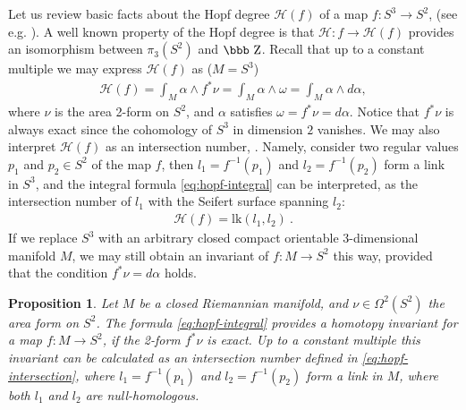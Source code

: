 \documentclass[12pt]{article}
\numberwithin{equation}{section}
\newtheorem{proposition}[theorem]{Proposition}
\newcommand{\Z}{\mbox{\bbb Z}}
\begin{document}
Let us review basic facts about the Hopf degree $\mathscr{H}(f)$ of a map 
$f:S^3\longrightarrow S^2$, (see
e.g. \cite{Bott82}). A well known property of the Hopf degree is that  $\mathscr{H}: f\longrightarrow \mathscr{H}(f)$ provides an isomorphism between $\pi_3(S^2)$
and $\Z$. Recall that up to a constant multiple we
may express $\mathscr{H}(f)$ as ($M=S^3$)
\begin{gather}\label{eq:hopf-integral}
\mathscr{H}(f)= \int_{M} \alpha\wedge f^\ast\nu=\int_{M} \alpha\wedge \omega=\int_{M} \alpha\wedge d\alpha,
\end{gather}
where $\nu$ is the area 2-form on $S^2$, and $\alpha$ satisfies
$\omega=f^\ast\nu=d\alpha$. Notice that $f^\ast\nu$ is always exact
since the cohomology of $S^3$ in dimension $2$ vanishes. We may also interpret $\mathscr{H}(f)$ as an intersection number,
\cite{Bott82, Milnor97}. Namely, consider two regular values $p_1$ and $p_2\in S^2$ of the map $f$,
then $l_1=f^{-1}(p_1)$ and $l_2=f^{-1}(p_2)$ form a link in $S^3$, and the integral formula
\eqref{eq:hopf-integral} can be interpreted, as the intersection number of $l_1$ with the Seifert surface spanning $l_2$:
\begin{gather}\label{eq:hopf-intersection}
\mathscr{H}(f)=\text{lk}(l_1,l_2)\ .
\end{gather}
If we replace $S^3$ with an arbitrary closed
compact orientable 3-dimensional manifold $M$, we may still obtain
an invariant of $f:M\longrightarrow S^2$ this way, provided that
the condition $f^\ast\nu=d\alpha$ holds. 

\begin{proposition}\label{th:hopf-degree-general}
 Let $M$ be a closed Riemannian manifold, and $\nu\in \Omega^2(S^2)$ the area form on $S^2$.
 The formula \eqref{eq:hopf-integral} provides a homotopy invariant 
 for a map $f:M\longrightarrow S^2$, if the 2-form $f^\ast\nu$ is exact. Up to a constant multiple 
 this invariant can be calculated as an intersection number defined in \eqref{eq:hopf-intersection},
 where $l_1=f^{-1}(p_1)$ and $l_2=f^{-1}(p_2)$ form a link in $M$, where both $l_1$ and $l_2$ are null-homologous.
\end{proposition}
\end{document}
